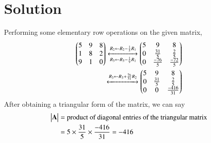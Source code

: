 \documentclass[journal,12pt]{IEEEtran}
\begin{document}
\section{Solution}
Performing some elementary row operations on the given matrix,
\begin{align}
    \begin{pmatrix}5 & 9 & 8\\ 1 & 8 & 2\\ 9 & 1 & 0\end{pmatrix} \xleftrightarrow[R_3 \leftarrow R_3 - \frac{1}{9}R_1]{R_2 \leftarrow R_2 - \frac{1}{5}R_1} \begin{pmatrix}5 & 9 & 8\\ 0 & \frac{31}{5} & \frac{2}{5} \\ 0 & \frac{-76}{5} & \frac{-72}{5}\end{pmatrix}\\
    \xleftrightarrow{R_3 \leftarrow R_3 + \frac{76}{31}R_2} \begin{pmatrix}5 & 9 & 8\\ 0 & \frac{31}{5} & \frac{2}{5} \\ 0 & 0 & \frac{-416}{31}\end{pmatrix}
\end{align}
After obtaining a triangular form of the matrix, we can say
\begin{align}
    \begin{vmatrix}\mathbf{A}\end{vmatrix} & = \text{product of diagonal entries of the triangular 
    matrix}\\&
    = 5 \times \frac{31}{5} \times \frac{-416}{31} = -416 \label{eq:finaldet}
\end{align}
\renewcommand{\thetable}{1}
\end{document}
